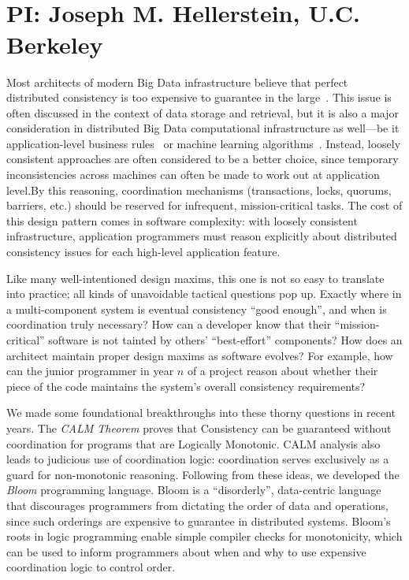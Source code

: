 \vspace{-2pt}
\section*{\mytitle\\
{\normalsize PI: Joseph M. Hellerstein, U.C. Berkeley}}
Most architects of modern Big Data infrastructure believe that perfect distributed consistency is too expensive to guarantee in the large~\cite{ladisreport}.  This issue is often discussed in the context of data storage and retrieval, but it is also a major consideration in distributed Big Data computational infrastructure as well---be it application-level business rules~\cite{finkelstein2011} or machine learning algorithms~\cite{hogwild}.  Instead, loosely consistent approaches are often considered to be a better choice, since temporary inconsistencies across machines can often be made to work out at application level.By this reasoning, coordination mechanisms (transactions, locks, quorums, barriers, etc.) should be reserved for infrequent, mission-critical tasks.  The cost of this design pattern comes in software complexity: with loosely consistent infrastructure, application programmers must reason explicitly about distributed consistency issues for each high-level application feature.

Like many well-intentioned design maxims, this one is not so easy to translate into practice; all kinds of unavoidable tactical questions pop up.  Exactly where in a multi-component system is eventual consistency “good enough”, and when is coordination truly necessary?  How can a developer know that their “mission-critical” software is not tainted by others' ``best-effort'' components?  How does an architect maintain proper design maxims as software evolves? For example, how can the junior programmer in year $n$ of a project reason about whether their piece of the code maintains the system’s overall consistency requirements?

We made some foundational breakthroughs into these thorny questions in recent years.  The \emph{CALM Theorem} proves that Consistency can be guaranteed without coordination for programs that are Logically Monotonic. CALM analysis also leads to judicious use of coordination logic: coordination serves exclusively as a guard for non-monotonic reasoning.  Following from these ideas, we developed the \emph{Bloom} programming language.  Bloom is a ``disorderly'', data-centric language that discourages programmers from dictating the order of data and operations, since such orderings are expensive to guarantee in distributed systems.  Bloom's roots in logic programming enable simple compiler checks for monotonicity, which can be used to inform programmers about when and why to use expensive coordination logic to control order.

